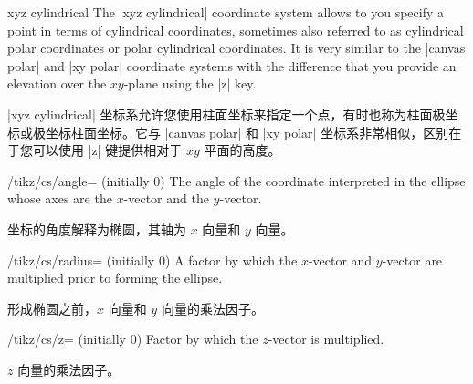 \begin{coordinatesystem}{xyz cylindrical}
    The |xyz cylindrical| coordinate system allows to you specify a point in
    terms of cylindrical coordinates, sometimes also referred to as cylindrical
    polar coordinates or polar cylindrical coordinates. It is very similar to
    the |canvas polar| and |xy polar| coordinate systems with the difference
    that you provide an elevation over the $xy$-plane using the |z| key.
    
    |xyz cylindrical| 坐标系允许您使用柱面坐标来指定一个点，有时也称为柱面极坐标或极坐标柱面坐标。它与 |canvas polar| 和 |xy polar| 坐标系非常相似，区别在于您可以使用 |z| 键提供相对于 $xy$ 平面的高度。


    \begin{key}{/tikz/cs/angle= (initially 0)}
        The angle of the coordinate interpreted in the ellipse whose axes are
        the $x$-vector and the $y$-vector.

        坐标的角度解释为椭圆，其轴为 $x$ 向量和 $y$ 向量。


    \end{key}
    \begin{key}{/tikz/cs/radius= (initially 0)}
        A factor by which the $x$-vector and $y$-vector are multiplied prior to
        forming the ellipse.

        形成椭圆之前，$x$ 向量和 $y$ 向量的乘法因子。


    \end{key}
    \begin{key}{/tikz/cs/z= (initially 0)}
        Factor by which the $z$-vector is multiplied.

        $z$ 向量的乘法因子。


    \end{key}
\begin{codeexample}[preamble={\usetikzlibrary{3d}}]
\end{codeexample}
\end{coordinatesystem}

